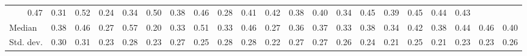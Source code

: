\begin{tabular}{lllllllllllllllllllll}
  \multicolumn{1}{r}{0.47} &
  \multicolumn{1}{r}{0.31} &
  \multicolumn{1}{r}{0.52} &
  \multicolumn{1}{r}{0.24} &
  \multicolumn{1}{r}{0.34} &
  \multicolumn{1}{r}{0.50} &
  \multicolumn{1}{r}{0.38} &
  \multicolumn{1}{r}{0.46} &
  \multicolumn{1}{r}{0.28} &
  \multicolumn{1}{r}{0.41} &
  \multicolumn{1}{r}{0.42} &
  \multicolumn{1}{r}{0.38} &
  \multicolumn{1}{r}{0.40} &
  \multicolumn{1}{r}{0.34} &
  \multicolumn{1}{r}{0.45} &
  \multicolumn{1}{r}{0.39} &
  \multicolumn{1}{r}{0.45} &
  \multicolumn{1}{r}{0.44} &
  \multicolumn{1}{r}{0.43} \\
\multicolumn{1}{l}{\hspace{2em}Median} &
  \multicolumn{1}{|r}{0.38} &
  \multicolumn{1}{r}{0.46} &
  \multicolumn{1}{r}{0.27} &
  \multicolumn{1}{r}{0.57} &
  \multicolumn{1}{r}{0.20} &
  \multicolumn{1}{r}{0.33} &
  \multicolumn{1}{r}{0.51} &
  \multicolumn{1}{r}{0.33} &
  \multicolumn{1}{r}{0.46} &
  \multicolumn{1}{r}{0.27} &
  \multicolumn{1}{r}{0.36} &
  \multicolumn{1}{r}{0.37} &
  \multicolumn{1}{r}{0.33} &
  \multicolumn{1}{r}{0.38} &
  \multicolumn{1}{r}{0.34} &
  \multicolumn{1}{r}{0.42} &
  \multicolumn{1}{r}{0.38} &
  \multicolumn{1}{r}{0.44} &
  \multicolumn{1}{r}{0.46} &
  \multicolumn{1}{r}{0.40} \\
\multicolumn{1}{l}{\hspace{2em}Std. dev.} &
  \multicolumn{1}{|r}{0.30} &
  \multicolumn{1}{r}{0.31} &
  \multicolumn{1}{r}{0.23} &
  \multicolumn{1}{r}{0.28} &
  \multicolumn{1}{r}{0.23} &
  \multicolumn{1}{r}{0.27} &
  \multicolumn{1}{r}{0.25} &
  \multicolumn{1}{r}{0.28} &
  \multicolumn{1}{r}{0.28} &
  \multicolumn{1}{r}{0.22} &
  \multicolumn{1}{r}{0.27} &
  \multicolumn{1}{r}{0.27} &
  \multicolumn{1}{r}{0.26} &
  \multicolumn{1}{r}{0.24} &
  \multicolumn{1}{r}{0.21} &
  \multicolumn{1}{r}{0.25} &
  \multicolumn{1}{r}{0.21} &
  \multicolumn{1}{r}{0.23} &
  \multicolumn{1}{r}{0.23} &
  \multicolumn{1}{r}{0.26} \\
\cline{1-21}
\end{tabular}
